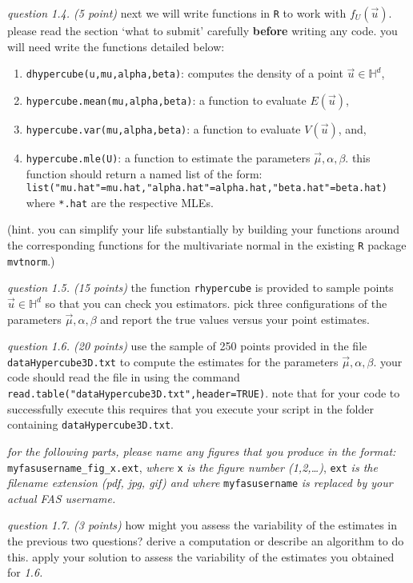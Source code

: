 \documentclass[11pt]{article}
\begin{document}
{\em question 1.4. (5 point)} next we will write functions in \texttt{R} to work with $f_U(\vec u)$. please read the section \lq{}what to submit\rq{} carefully \textbf{before} writing any code. you will need write the functions detailed below:
\begin{enumerate}
\item \texttt{dhypercube(u,mu,alpha,beta)}: computes the density of a point $\vec u \in \mathbb{H}^d$, 
\item \texttt{hypercube.mean(mu,alpha,beta)}: a function to evaluate $E(\vec u)$,
\item \texttt{hypercube.var(mu,alpha,beta)}: a function to evaluate $V(\vec u)$, and,
\item \texttt{hypercube.mle(U)}: a function to estimate the parameters $\vec \mu,\alpha,\beta$. this function should return a named list of the form:\\ 
\texttt{list("mu.hat"=mu.hat,"alpha.hat"=alpha.hat,"beta.hat"=beta.hat)}\\
where \texttt{*.hat} are the respective MLEs.
\end{enumerate}
%
(hint. you can simplify your life substantially by building your functions around the corresponding functions for the multivariate normal in the existing \texttt{R} package {\tt mvtnorm}.)

{\em question 1.5. (15 points)} the function {\tt rhypercube} is provided to sample points $\vec u \in \mathbb{H}^d$ so that you can check you estimators. pick three configurations of the parameters $\vec \mu,\alpha,\beta$ and report the true values versus your point estimates.

{\em question 1.6. (20 points)} use the sample of 250 points provided in the file {\tt dataHypercube3D.txt} to compute the estimates for the parameters $\vec \mu,\alpha,\beta$. your code should read the file in using the command \texttt{read.table("dataHypercube3D.txt",header=TRUE)}. note that for your code to successfully execute this requires that you execute your script in the folder containing \texttt{dataHypercube3D.txt}.

\emph{for the following parts, please name any figures that you produce in the format:}\\
\texttt{myfasusername\_fig\_x.ext}, \emph{where} \texttt{x} \emph{is the figure number (1,2,\ldots)}, \texttt{ext} \emph{is the filename extension (pdf, jpg, gif) and where} \texttt{myfasusername} \emph{is replaced by your actual FAS username.}

{\em question 1.7. (3 points)} how might you assess the variability of the estimates in the previous two questions? derive a computation or describe an algorithm to do this. apply your solution to assess the variability of the estimates you obtained for {\em 1.6.}
\end{document}
